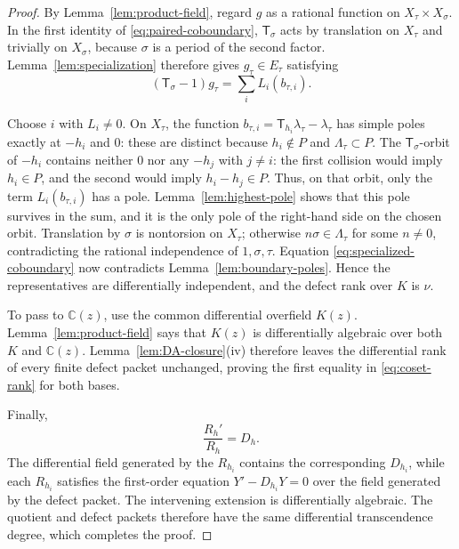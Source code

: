 \documentclass[11pt]{article}
\numberwithin{equation}{section}
\theoremstyle{definition}
\theoremstyle{remark}
\newcommand{\C}{\mathbb C}
\newcommand{\T}{\mathsf T}
\begin{document}
\begin{proof}
By Lemma~\ref{lem:product-field}, regard $g$ as a rational function on
$X_\tau\times X_\sigma$.  In the first identity of
\eqref{eq:paired-coboundary}, $\T_\sigma$ acts by translation on
$X_\tau$ and trivially on $X_\sigma$, because $\sigma$ is a period of the
second factor.  Lemma~\ref{lem:specialization} therefore gives
$g_\tau\in E_\tau$ satisfying
\begin{equation}
 (\T_\sigma-1)g_\tau
 =\sum_iL_i(b_{\tau,i}).
 \label{eq:specialized-coboundary}
\end{equation}

Choose $i$ with $L_i\neq0$.  On $X_\tau$, the function
$b_{\tau,i}=\T_{h_i}\lambda_\tau-\lambda_\tau$ has simple poles exactly at
$-h_i$ and $0$: these are distinct because $h_i\notin P$ and
$\Lambda_\tau\subset P$.  The $\T_\sigma$-orbit of $-h_i$ contains neither $0$ nor
any $-h_j$ with $j\neq i$: the first collision would imply $h_i\in P$, and
the second would imply $h_i-h_j\in P$.  Thus, on that orbit, only the term
$L_i(b_{\tau,i})$ has a pole.  Lemma~\ref{lem:highest-pole} shows that this
pole survives in the sum, and it is the only pole of the right-hand side on
the chosen orbit.  Translation by $\sigma$ is nontorsion on $X_\tau$;
otherwise $n\sigma\in\Lambda_\tau$ for some $n\neq0$, contradicting the
rational independence of $1,\sigma,\tau$.  Equation
\eqref{eq:specialized-coboundary} now contradicts
Lemma~\ref{lem:boundary-poles}.  Hence the representatives are
differentially independent, and the defect rank over $K$ is $\nu$.

To pass to $\C(z)$, use the common differential overfield $K(z)$.
Lemma~\ref{lem:product-field} says that $K(z)$ is differentially algebraic
over both $K$ and $\C(z)$.  Lemma~\ref{lem:DA-closure}(iv) therefore leaves
the differential rank of every finite defect packet unchanged, proving the
first equality in \eqref{eq:coset-rank} for both bases.

Finally,
\begin{equation}
 \frac{R_h'}{R_h}=D_h.
 \label{eq:R-logderiv}
\end{equation}
The differential field generated by the $R_{h_i}$ contains the corresponding
$D_{h_i}$, while each $R_{h_i}$ satisfies the first-order equation
$Y'-D_{h_i}Y=0$ over the field generated by the defect packet.  The
intervening extension is differentially algebraic.  The quotient and defect
packets therefore have the same differential transcendence degree, which
completes the proof.
\end{proof}
\end{document}
